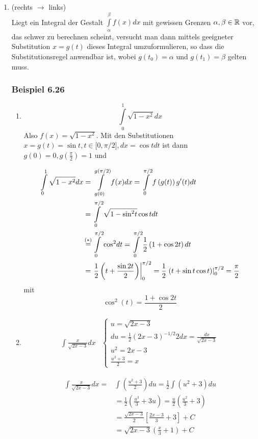 \begin{enumerate}
\begin{enumerate}
\end{enumerate}
\item (rechts $\to$ links)\\
Liegt ein Integral der Gestalt $\int\limits_\alpha ^\beta  {f(x)dx}$ mit gewissen Grenzen $\alpha,\beta\in\mathbb{R}$ vor, das schwer zu berechnen scheint, versucht man dann mittels geeigneter Substitution $x=g(t)$ dieses Integral umzuformulieren, so dass die Substitutionsregel anwendbar ist, wobei $g(t_0)=\alpha$ und $g(t_1)=\beta$ gelten muss.
\subsubsection*{Beispiel 6.26}
\begin{enumerate}
\item \[\int\limits_0^1 {\sqrt {1 - {x^2}} dx} \] Also $f(x)=\sqrt{1-x^2}$. Mit den Substitutionen $x=g(t)=\sin t, t\in \lbrack 0,\pi/2\rbrack, dx=\cos tdt$ ist dann $g(0)=0, g\left(\frac{\pi}{2}\right)=1$ und

\begin{align*}
\int\limits_0^1 {\sqrt {1 - {x^2}} } dx &=\int\limits_{g(0)}^{g(\pi /2)} {f(x)dx = \int\limits_0^{\pi /2} {f\left( {g(t)} \right)g'(t)dt} } \\
 &=\int\limits_0^{\pi /2} {\sqrt {1 - {{\sin }^2}t}} \cos tdt\mathop {\rm{  }}\\
&\mathop= \limits^{( * )} \int\limits_0^{\pi /2} {{{\cos }^2}dt}  = \int\limits_0^{\pi /2} {\frac{1}{2}\left( {1 + \cos 2t} \right)dt} \\
&=\left. {\frac{1}{2}\left( {t + \frac{{\sin 2t}}{2}} \right)} \right|_0^{\pi /2} = \frac{1}{2}\left. {\left( {t + \sin t\cos t} \right)} \right|_0^{\pi /2} = \frac{\pi }{2}
\end{align*}
mit
\[
{\cos ^2}(t) = \frac{{1 + \cos 2t}}{2} \tag{\textasteriskcentered}
\]

\item \[\begin{array}{*{20}{c}}
{\int {\frac{x}{{\sqrt {2x - 3} }}dx} }&{\left\{ {\begin{array}{*{20}{l}}
{u = \sqrt {2x - 3} }\\
{du = \frac{1}{2}{{\left( {2x - 3} \right)}^{ - 1/2}}2dx = \frac{{dx}}{{\sqrt {2x - 3} }}}\\
{{u^2} = 2x - 3}\\
{\frac{{{u^2} + 3}}{2} = x}
\end{array}} \right.}
\end{array}\]

\begin{align*}
\int {\frac{x}{{\sqrt {2x - 3} }}dx}  =&\int {\left( {\frac{{{u^2} + 3}}{2}} \right)} du = \frac{1}{2}\int {({u^2} + 3)du} \\
&= \frac{1}{2}\left( {\frac{{{u^3}}}{3} + 3u} \right) = \frac{u}{2}\left( {\frac{{{u^2}}}{3} + 3} \right)\\
&= \frac{{\sqrt {2x - 3} }}{2}\left[ {\frac{{2x - 3}}{3} + 3} \right] + C\\
&= \sqrt {2x - 3} \left( {\frac{x}{3} + 1} \right) + C
\end{align*}
\end{enumerate}

\end{enumerate}
